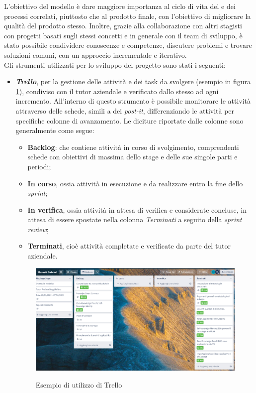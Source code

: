 L'obiettivo del modello è dare maggiore importanza al ciclo di vita del  e dei processi correlati, piuttosto che al prodotto finale, con l'obiettivo di migliorare la qualità del prodotto stesso.
Inoltre, grazie alla collaborazione con altri stagisti con progetti basati sugli stessi concetti e in generale con il team di sviluppo, è stato possibile condividere conoscenze e competenze,
discutere problemi e trovare soluzioni comuni, con un approccio incrementale e iterativo. \\

Gli strumenti utilizzati per lo sviluppo del progetto sono stati i seguenti:
\begin{itemize}
    \item{\textit{\textbf{Trello}}}, per la gestione delle attività e dei task da svolgere (esempio in figura  \ref{fig:trello}), condiviso con il tutor aziendale e verificato dallo stesso ad ogni incremento.
    All'interno di questo strumento è possibile monitorare le attività attraverso delle schede, simili a dei \textit{post-it}, differenziando le attività per specifiche colonne di avanzamento.
    Le diciture riportate dalle colonne sono generalmente come segue:
    \begin{itemize}
        \item{\textbf{Backlog}}: che contiene attività in corso di svolgimento, comprendenti schede con obiettivi di massima dello stage e delle sue singole parti e periodi;
        \item{\textbf{In corso}}, ossia attività in esecuzione e da realizzare entro la fine dello \textit{sprint};
        \item{\textbf{In verifica}}, ossia attività in attesa di verifica e considerate concluse, in attesa di essere spostate nella colonna \textit{Terminati} a seguito della \textit{sprint review};
        \item{\textbf{Terminati}}, cioè attività completate e verificate da parte del tutor aziendale.
    \end{itemize} 
    \begin{figure}[h]
        \centering
        \includegraphics[width=1\textwidth, alt={Esempio di utilizzo di Trello}]{immagini/trello.png}
        \caption{Esempio di utilizzo di Trello}\label{fig:trello}
    \end{figure}


\end{itemize}
